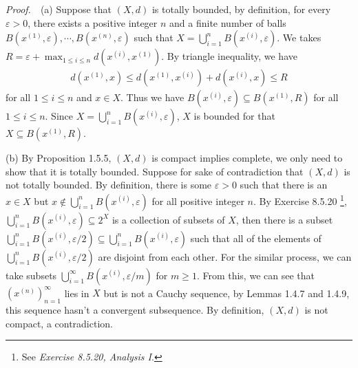 \documentclass{book}
\newcommand{\pff}{\vspace{.25em}\noindent\emph{Proof.}~~}
\newcounter{Exercise}[section]
\begin{document}
\pff (a) Suppose that $(X,d)$ is totally bounded, by definition, for every $\varepsilon>0$, there exists a positive integer $n$ and a finite number of balls $B(x^{(1)},\varepsilon),\cdots, B(x^{(n)},\varepsilon)$ such that $X=\bigcup_{i=1}^{n}B(x^{(i)},\varepsilon)$. We takes $R=\varepsilon+\max_{1\leq i\leq n}d(x^{(i)},x^{(1)})$. By triangle inequality, we have
    \begin{align*}
        d(x^{(1)},x)\leq d(x^{(1)},x^{(i)})+d(x^{(i)},x)\leq R
    \end{align*}
for all $1\leq i\leq n$ and $x\in X$. Thus we have $B(x^{(i)},\varepsilon)\subseteq B(x^{(1)},R)$ for all $1\leq i\leq n$. Since $X=\bigcup_{i=1}^{n}B(x^{(i)},\varepsilon)$, $X$ is bounded for that $X\subseteq B(x^{(1)},R)$.

(b) By Proposition 1.5.5, $(X,d)$ is compact implies complete, we only need to show that it is totally bounded. Suppose for sake of contradiction that $(X,d)$ is not totally bounded. By definition, there is some $\varepsilon>0$ such that there is an $x\in X$ but $x\notin\bigcup_{i=1}^{n}B(x^{(i)},\varepsilon)$ for all positive integer $n$. %
By Exercise 8.5.20 \footnote{See \emph{Exercise 8.5.20, Analysis I}.}, $\bigcup_{i=1}^{n}B(x^{(i)},\varepsilon)\subseteq 2^X$ is a collection of subsets of $X$, then there is a subset $\bigcup_{i=1}^{n}B(x^{(i)},\varepsilon/2)\subseteq\bigcup_{i=1}^{n}B(x^{(i)},\varepsilon)$ such that all of the elements of $\bigcup_{i=1}^{n}B(x^{(i)},\varepsilon/2)$ are disjoint from each other. For the similar process, we can take subsets $\bigcup_{i=1}^{\infty}B(x^{(i)},\varepsilon/m)$ for $m\geq 1$.
 From this, we can see that $(x^{(n)})_{n=1}^{\infty}$ lies in $X$ but is not a Cauchy sequence, by Lemmas 1.4.7 and 1.4.9, this sequence hasn't a convergent subsequence. By definition, $(X,d)$ is not compact, a contradiction.
\end{document}
